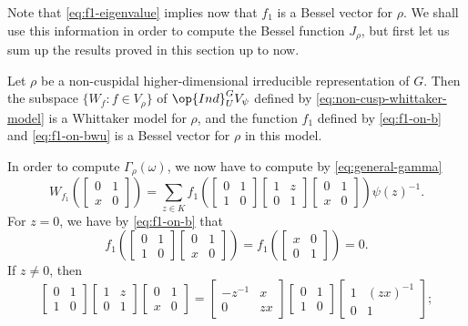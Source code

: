\documentclass[../main.tex]{subfiles}
\begin{document}
Note that \eqref{eq:f1-eigenvalue} implies now that $f_1$ is a Bessel vector for $\rho$. We shall use this information in order to compute the Bessel function $J_\rho$, but first let us sum up the results proved in this section up to now.
\begin{lemma}
	Let $\rho$ be a non-cuspidal higher-dimensional irreducible representation of $G$. Then the subspace $\{W_f:f\in V_\rho\}$ of $\op{Ind}^G_UV_\psi$ defined by \eqref{eq:non-cusp-whittaker-model} is a Whittaker model for $\rho$, and the function $f_1$ defined by \eqref{eq:f1-on-b} and \eqref{eq:f1-on-bwu} is a Bessel vector for $\rho$ in this model.
\end{lemma}
In order to compute $\Gamma_\rho(\omega)$, we now have to compute by \eqref{eq:general-gamma}
\begin{equation}
	W_{f_1}\left(\begin{bmatrix}
		0 & 1 \\
		x & 0
	\end{bmatrix}\right)=\sum_{z\in K}f_1\left(\begin{bmatrix}
		0 & 1 \\
		1 & 0
	\end{bmatrix}\begin{bmatrix}
		1 & z \\
		0 & 1
	\end{bmatrix}\begin{bmatrix}
		0 & 1 \\
		x & 0
	\end{bmatrix}\right)\psi(z)^{-1}. \label{eq:compute-w-f1}
\end{equation}
For $z=0$, we have by \eqref{eq:f1-on-b} that
\[f_1\left(\begin{bmatrix}
	0 & 1 \\
	1 & 0
\end{bmatrix}\begin{bmatrix}
	0 & 1 \\
	x & 0
\end{bmatrix}\right)=f_1\left(\begin{bmatrix}
	x & 0 \\
	0 & 1
\end{bmatrix}\right)=0.\]
If $z\ne0$, then
\[\begin{bmatrix}
	0 & 1 \\
	1 & 0
\end{bmatrix}\begin{bmatrix}
	1 & z \\
	0 & 1
\end{bmatrix}\begin{bmatrix}
	0 & 1 \\
	x & 0
\end{bmatrix}=\begin{bmatrix}
	-z^{-1} & x \\
	0 & zx
\end{bmatrix}\begin{bmatrix}
	0 & 1 \\
	1 & 0
\end{bmatrix}\begin{bmatrix}
	1 & (zx)^{-1} \\
	0 & 1
\end{bmatrix};\]
\end{document}
